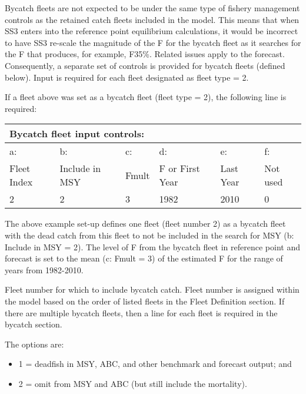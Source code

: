Bycatch fleets are not expected to be under the same type of fishery management controls as the retained catch fleets included in the model.  This means that when SS3 enters into the reference point equilibrium calculations, it would be incorrect to have SS3 re-scale the magnitude of the F for the bycatch fleet as it searches for the F that produces, for example, F35\%.  Related issues apply to the forecast.  Consequently, a separate set of controls is provided for bycatch fleets (defined below).  Input is required for each fleet designated as fleet type = 2.

\noindent If a fleet above was set as a bycatch fleet (fleet type = 2), the following line is required: 
\begin{center}
	\begin{tabular}{p{2.25cm} p{2.65cm} p{2.25cm} p{2.5cm} p{2.5cm} p{2cm} }

		\multicolumn{6}{l}{Bycatch fleet input controls:}\\
		\hline
		a: 			   & b:  			  & c:    & d:     & e:    & f: \Tstrut\\
		 Fleet Index   & Include in MSY   & Fmult & F or First Year & Last Year & Not used \Bstrut\\			
		\hline
		2 & 2  & 3 & 1982 & 2010 & 0 \Tstrut\Bstrut\\
		\hline		
	\end{tabular}
\end{center}

The above example set-up defines one fleet (fleet number 2) as a bycatch fleet with the dead catch from this fleet to not be included in the search for MSY (b: Include in MSY = 2). The level of F from the bycatch fleet in reference point and forecast is set to the mean (c: Fmult = 3) of the estimated F for the range of years from 1982-2010.  


Fleet number for which to include bycatch catch. Fleet number is assigned within the model based on the order of listed fleets in the Fleet Definition section. If there are multiple bycatch fleets, then a line for each fleet is required in the bycatch section.


The options are:	  
  \begin{itemize}
  	\item 1 = deadfish in MSY, ABC, and other benchmark and forecast output; and
  	\item 2 = omit from MSY and ABC (but still include the mortality).
  \end{itemize}

